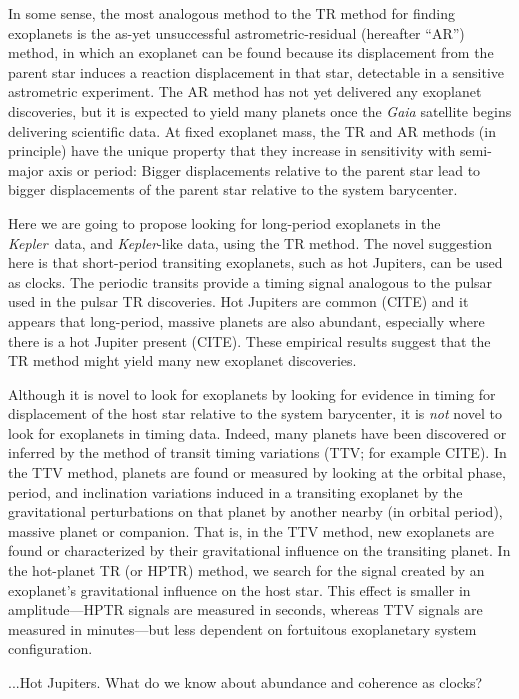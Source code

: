 \documentclass[12pt, preprint]{aastex}
\newcommand{\project}[1]{\textsl{#1}}
\newcommand{\Kepler}{\project{Kepler}}
\begin{document}
In some sense, the most analogous method to the TR method for finding
exoplanets is the as-yet unsuccessful astrometric-residual (hereafter
``AR'') method, in which an exoplanet can be found because its
displacement from the parent star induces a reaction displacement in
that star, detectable in a sensitive astrometric experiment.
The AR method has not yet delivered any exoplanet discoveries, but it
is expected to yield many planets once the \project{Gaia} satellite
begins delivering scientific data.
At fixed exoplanet mass, the TR and AR methods (in principle) have the
unique property that they increase in sensitivity with semi-major axis
or period:
Bigger displacements relative to the parent star lead to bigger
displacements of the parent star relative to the system barycenter.

Here we are going to propose looking for long-period exoplanets in the
\Kepler\ data, and \Kepler-like data, using the TR method.
The novel suggestion here is that short-period transiting exoplanets,
such as hot Jupiters, can be used as clocks.
The periodic transits provide a timing signal analogous to the pulsar
used in the pulsar TR discoveries.
Hot Jupiters are common (CITE) and it appears that long-period,
massive planets are also abundant, especially where there is a hot
Jupiter present (CITE).
These empirical results suggest that the TR method might yield many
new exoplanet discoveries.

Although it is novel to look for exoplanets by looking for evidence in
timing for displacement of the host star relative to the system
barycenter, it is \emph{not} novel to look for exoplanets in timing
data.
Indeed, many planets have been discovered or inferred by the method of
transit timing variations (TTV; for example CITE).
In the TTV method, planets are found or measured by looking at the
orbital phase, period, and inclination variations induced in a
transiting exoplanet by the gravitational perturbations on that planet
by another nearby (in orbital period), massive planet or companion.
That is, in the TTV method, new exoplanets are found or characterized by their
gravitational influence on the transiting planet.
In the hot-planet TR (or HPTR) method, we search for the signal
created by an exoplanet's gravitational influence on the host star.
This effect is smaller in amplitude---HPTR signals are measured in
seconds, whereas TTV signals are measured in minutes---but less
dependent on fortuitous exoplanetary system configuration.

...Hot Jupiters.  What do we know about abundance and coherence as
clocks?
\end{document}
